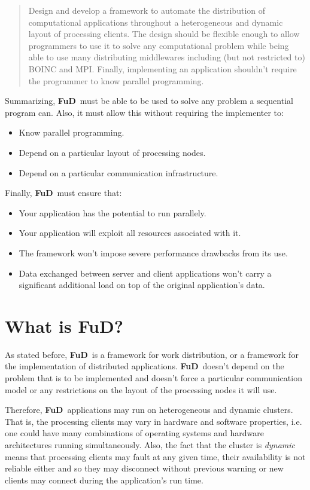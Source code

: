 \documentclass[a4paper,12pt,english]{report}
\newcommand{\fud}{\textbf{FuD}}
\begin{document}
\begin{quote}
Design and develop a framework to automate the distribution of computational applications throughout a heterogeneous and dynamic layout of processing clients. The design should be flexible enough to allow programmers to use it to solve any computational problem while being able to use many distributing middlewares including (but not restricted to) BOINC and MPI. Finally, implementing an application shouldn't require the programmer to know parallel programming.
\end{quote}

Summarizing, \fud \ must be able to be used to solve any problem a sequential program can. Also, it must allow this without requiring the implementer to:
\begin{itemize}
\item Know parallel programming.
\item Depend on a particular layout of processing nodes.
\item Depend on a particular communication infrastructure.
\end{itemize}

Finally, \fud \ must ensure that:
\begin{itemize}
\item Your application has the potential to run parallely.
\item Your application will exploit all resources associated with it.
\item The framework won't impose severe performance drawbacks from its use.
\item Data exchanged between server and client applications won't carry a significant additional load on top of the original application's data.
\end{itemize}


\section{What is \fud?}

As stated before, \fud \ is a framework for work distribution, or a framework for the implementation of distributed applications. \fud \ doesn't depend on the problem that is to be implemented and doesn't force a particular communication model or any restrictions on the layout of the processing nodes it will use.

Therefore, \fud \ applications may run on heterogeneous and dynamic clusters. That is, the processing clients may vary in hardware and software properties, i.e. one could have many combinations of operating systems and hardware architectures running simultaneously. Also, the fact that the cluster is \emph{dynamic} means that processing clients may fault at any given time, their availability is not reliable either and so they may disconnect without previous warning or new clients may connect during the application's run time.
\end{document}
